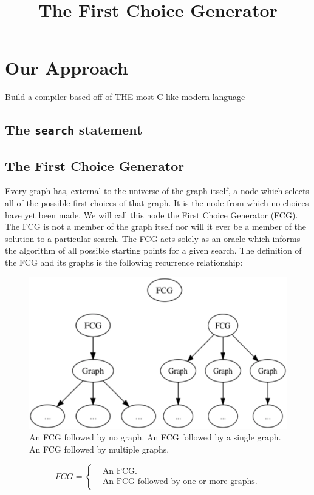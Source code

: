 \documentclass[runningheads]{llncs}
\newcommand{\code}[1]{\texttt{#1}}
\begin{document}
\section{Our Approach}
Build a compiler based off of THE most C like modern language

\subsection{The \code{search} statement}

\subsection{The First Choice Generator}
Every graph has, external to the universe of the graph itself, a node which selects all of the
possible first choices of that graph. It is the node from which no choices have yet been made. We will call this node the First Choice Generator (FCG). The FCG is not a member of the graph itself nor will it ever be a member of the solution to a particular search. The FCG acts solely as an oracle which informs the algorithm of all possible starting points for a given search. The definition of the FCG and its graphs is the following recurrence relationship:

\begin{figure}
\includegraphics[width=\textwidth]{images/fcg.png}
\title{The First Choice Generator}
\label{The First Choice Generator}
\caption{An FCG followed by no graph. An FCG followed by a single graph. An FCG followed by multiple graphs.}
\end{figure}

\begin{equation}
  FCG=\begin{cases}
  	& \text{An FCG}.\\
  	& \text{An FCG followed by one or more graphs}.
  	\end{cases}
\end{equation}
\end{document}
